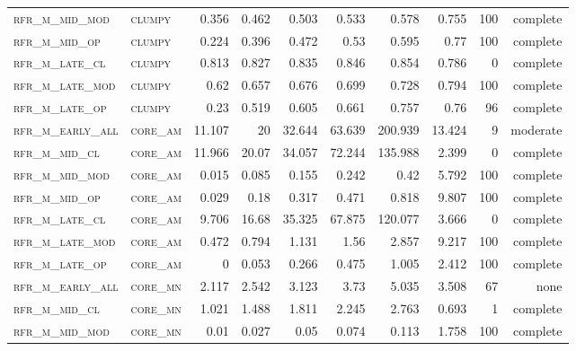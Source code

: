 \begin{landscape}
\begin{center}
\begin{footnotesize}
\begin{longtable}{llrrrrr|rrr}
\textsc{rfr\_m\_mid\_mod  } & \textsc{clumpy    }   & 0.356   & 0.462   & 0.503   & 0.533    & 0.578    & 0.755   & 100 & complete \\
\textsc{rfr\_m\_mid\_op   } & \textsc{clumpy    }   & 0.224   & 0.396   & 0.472   & 0.53     & 0.595    & 0.77    & 100 & complete \\
\textsc{rfr\_m\_late\_cl  } & \textsc{clumpy    }   & 0.813   & 0.827   & 0.835   & 0.846    & 0.854    & 0.786   & 0   & complete \\
\textsc{rfr\_m\_late\_mod } & \textsc{clumpy    }   & 0.62    & 0.657   & 0.676   & 0.699    & 0.728    & 0.794   & 100 & complete \\
\textsc{rfr\_m\_late\_op  } & \textsc{clumpy    }   & 0.23    & 0.519   & 0.605   & 0.661    & 0.757    & 0.76    & 96  & complete \\
\textsc{rfr\_m\_early\_all} & \textsc{core\_am  }   & 11.107  & 20      & 32.644  & 63.639   & 200.939  & 13.424  & 9   & moderate \\
\textsc{rfr\_m\_mid\_cl   } & \textsc{core\_am  }   & 11.966  & 20.07   & 34.057  & 72.244   & 135.988  & 2.399   & 0   & complete \\
\textsc{rfr\_m\_mid\_mod  } & \textsc{core\_am  }   & 0.015   & 0.085   & 0.155   & 0.242    & 0.42     & 5.792   & 100 & complete \\
\textsc{rfr\_m\_mid\_op   } & \textsc{core\_am  }   & 0.029   & 0.18    & 0.317   & 0.471    & 0.818    & 9.807   & 100 & complete \\
\textsc{rfr\_m\_late\_cl  } & \textsc{core\_am  }   & 9.706   & 16.68   & 35.325  & 67.875   & 120.077  & 3.666   & 0   & complete \\
\textsc{rfr\_m\_late\_mod } & \textsc{core\_am  }   & 0.472   & 0.794   & 1.131   & 1.56     & 2.857    & 9.217   & 100 & complete \\
\textsc{rfr\_m\_late\_op  } & \textsc{core\_am  }   & 0       & 0.053   & 0.266   & 0.475    & 1.005    & 2.412   & 100 & complete \\
\textsc{rfr\_m\_early\_all} & \textsc{core\_mn  }   & 2.117   & 2.542   & 3.123   & 3.73     & 5.035    & 3.508   & 67  & none     \\
\textsc{rfr\_m\_mid\_cl   } & \textsc{core\_mn  }   & 1.021   & 1.488   & 1.811   & 2.245    & 2.763    & 0.693   & 1   & complete \\
\textsc{rfr\_m\_mid\_mod  } & \textsc{core\_mn  }   & 0.01    & 0.027   & 0.05    & 0.074    & 0.113    & 1.758   & 100 & complete \\

\end{longtable}
\end{footnotesize}
\end{center}
\end{landscape}

